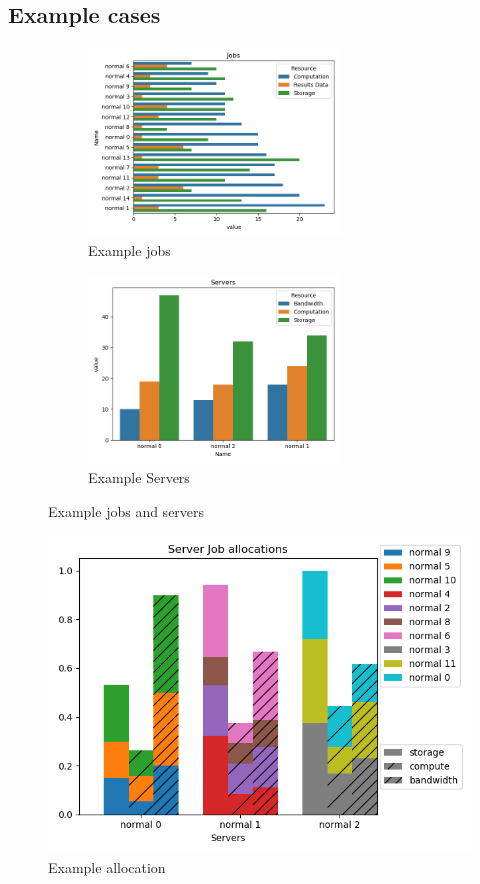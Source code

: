 \documentclass[fleqn]{article}
\begin{document}
\subsection{Example cases}\label{subsec:example-cases}
\begin{figure}[H]
    \begin{subfigure}{0.5\textwidth}
        \includegraphics[width=1\linewidth, height=5cm]{../results/jobs.png}
        \caption{Example jobs}
    \end{subfigure}
    \begin{subfigure}{0.5\textwidth}
        \includegraphics[width=1\linewidth, height=5cm]{../results/servers.png}
        \caption{Example Servers}
    \end{subfigure}

    \caption{Example jobs and servers}
\end{figure}

\begin{figure}[H]
    \centering
    \includegraphics[width=1\textwidth]{../results/greedy_allocation.png}
    \caption{Example allocation}
\end{figure}
\end{document}
